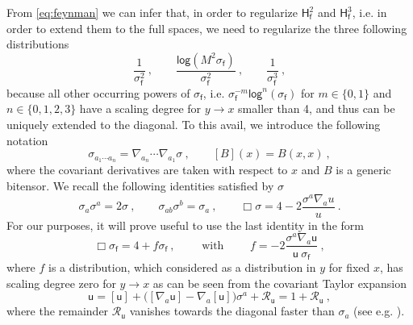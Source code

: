 \documentclass[11pt]{book}
\renewcommand{\log}{\mathsf{log}}
\newcommand{\Rcal}{\mathcal{R}}
\newcommand{\Hsf}{\mathsf{H}}
\newcommand{\fsf}{\mathsf{f}}
\newcommand{\usf}{\mathsf{u}}
\theoremstyle{break}
\begin{document}
From \eqref{eq:feynman} we can infer that, in order to regularize $\Hsf^2_\fsf$ and $\Hsf^3_\fsf$, i.e. in order to extend them to the full spaces, we need to regularize the three following distributions
%
\begin{equation}
\frac{1}{\sigma_\fsf^2} \ , \qquad \frac{\log \left(M^2 \sigma_\fsf\right)}{\sigma_\fsf^2} \ , \qquad \frac{1}{\sigma_\fsf^3} \ ,
\label{eq:sigma_problematic}
\end{equation}
%
because all other occurring powers of $\sigma_\fsf$, i.e. $\sigma^{-m}_\fsf\log^n(\sigma_\fsf)$ for $m\in\{0,1\}$ and $n\in\{0,1,2,3\}$ have a scaling degree for $y\to x$ smaller than 4, and thus can be uniquely extended to the diagonal. To this avail, we introduce the following notation
%
\begin{equation*}
\sigma_{a_1\cdots a_n} = \nabla_{a_n} \cdots \nabla_{a_1} \sigma \ , \qquad [B](x) = B(x,x) \ , 
\end{equation*}
%
where the covariant derivatives are taken with respect to $x$ and $B$ is a generic bitensor. We recall the following identities satisfied by $\sigma$ 
%
\begin{equation}
\sigma_a \sigma^a = 2 \sigma \ , \qquad 
\sigma_{ab} \sigma^b = \sigma_a \ , \qquad 
\Box \sigma = 4 - 2 \frac{\sigma^a \nabla_a u}{u} \ .
\label{eq:sigma_identities}
\end{equation}
%
For our purposes, it will prove useful to use the last identity in the form
%
\begin{equation*}
\Box \sigma_\fsf = 4 + f \sigma_\fsf \ , \qquad
\mbox{ with } \qquad f = - 2 \frac{\sigma^a \nabla_a \usf}{\usf \ \sigma_\fsf} \ ,
\label{eq:def_f_sigma}
\end{equation*}
%
where $f$ is a distribution, which considered as a distribution in $y$ for fixed $x$, has scaling degree zero for $y \to x$ as can be seen from the covariant Taylor expansion
%
\begin{equation*}
\usf = [\usf] + \bigg( [\nabla_a \usf] - \nabla_a [\usf] \bigg) \sigma^a + \Rcal_\usf = 1 + \Rcal_\usf \ , 
\end{equation*}
%
where the remainder $\Rcal_\usf$ vanishes towards the diagonal faster than $\sigma_a$  (see e.g. \cite{PPV_2011}).
\end{document}
